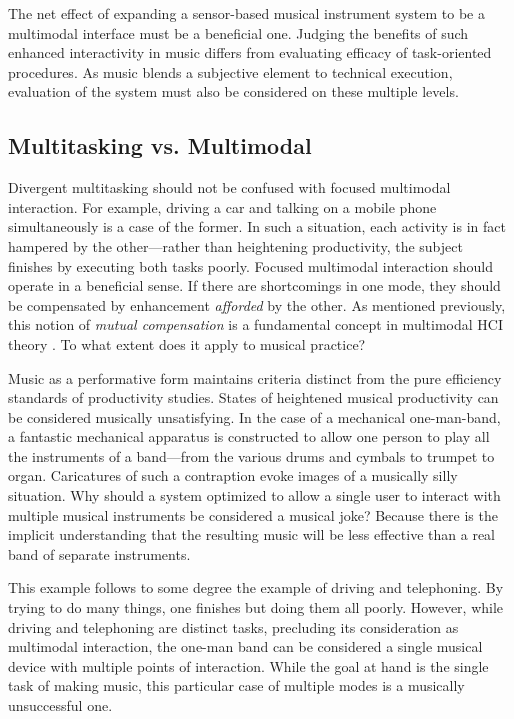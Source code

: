 The net effect of expanding a sensor-based musical instrument system to be a multimodal interface must be a beneficial one. Judging the benefits of such enhanced interactivity in music differs from evaluating efficacy of task-oriented procedures. As music blends a subjective element to technical execution, evaluation of the system must also be considered on these multiple levels. 

\subsection{Multitasking vs. Multimodal}


Divergent multitasking should not be confused with focused multimodal interaction. For example, driving a car and talking on a mobile phone simultaneously is a case of the former. In such a situation, each activity is in fact hampered by the other---rather than heightening productivity, the subject finishes by executing both tasks poorly. Focused multimodal interaction should operate in a beneficial sense. If there are shortcomings in one mode, they should be compensated by enhancement \textit{afforded} by the other. As mentioned previously, this notion of \textit{mutual compensation} is a fundamental concept in multimodal HCI theory \cite{Oviatt:2003}. To what extent does it apply to musical practice?

Music as a performative form maintains criteria distinct from the pure efficiency standards of productivity studies. States of heightened musical productivity can be considered musically unsatisfying. In the case of a mechanical one-man-band, a fantastic mechanical apparatus is constructed to allow one person to play all the instruments of a band---from the various drums and cymbals to trumpet to organ. Caricatures of such a contraption evoke images of a musically silly situation. Why should a system optimized to allow a single user to interact with multiple musical instruments be considered a musical joke? Because there is the implicit understanding that the resulting music will be less effective than a real band of separate instruments. 

This example follows to some degree the example of driving and telephoning. By trying to do many things, one finishes but doing them all poorly. However, while driving and telephoning are distinct tasks, precluding its consideration as multimodal interaction, the one-man band can be considered a single musical device with multiple points of interaction. While the goal at hand is the single task of making music, this particular case of multiple modes is a musically unsuccessful one. 



